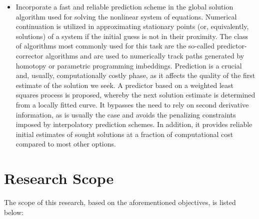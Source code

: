 \begin{itemize}
	\item Incorporate a fast and reliable prediction scheme in the global solution 
	algorithm used for solving the nonlinear system of equations. Numerical 
	continuation is utilized in approximating stationary points (or, equivalently, 
	solutions) of a system if the initial guess is not in their proximity. The class 
	of algorithms most commonly used for this task are the so-called 
	predictor-corrector algorithms and are used to numerically track paths generated 
	by homotopy or parametric programming imbeddings. Prediction is a crucial and, 
	usually, computationally costly phase, as it affects the quality of the first 
	estimate of the solution we seek. A predictor based on a weighted least squares 
	process is proposed, whereby the next solution estimate is determined from a 
	locally fitted curve. It bypasses the need to rely on second derivative 
	information, as is usually the case and avoids the penalizing constraints imposed 
	by interpolatory prediction schemes. In addition, it provides reliable initial 
	estimates of sought solutions at a fraction of computational cost compared to most 
	other options.
	
\end{itemize}

\section{Research Scope}
The scope of this research, based on the aforementioned objectives, is listed below:

